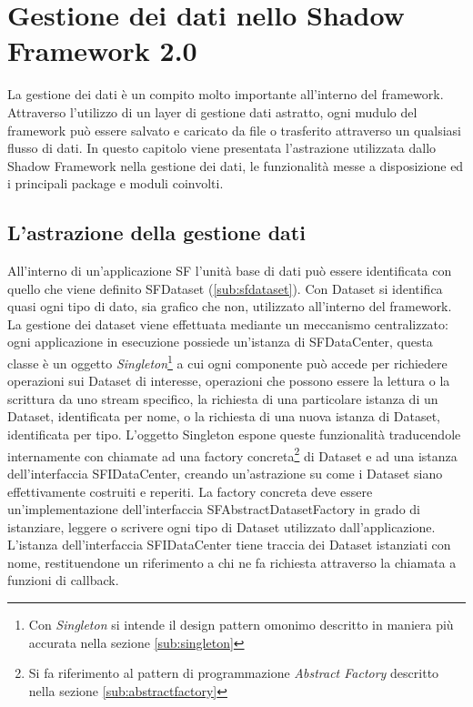 
\chapter{Gestione dei dati nello Shadow Framework 2.0}
\label{ch:gestionedati}

La gestione dei dati è un compito molto importante all'interno del framework. Attraverso l'utilizzo di un layer di gestione dati astratto, ogni mudulo del framework può essere salvato e caricato da file o trasferito attraverso un qualsiasi flusso di dati.
In questo capitolo viene presentata l'astrazione utilizzata dallo Shadow Framework nella gestione dei dati, le funzionalità messe a disposizione ed i principali package e moduli coinvolti.

\section{L'astrazione della gestione dati}
\label{sec:astrazione}
All'interno di un'applicazione \ac{SF} l'unità base di dati può essere identificata con quello che viene definito SFDataset (\ref{sub:sfdataset}). Con Dataset si identifica quasi ogni tipo di dato, sia grafico che non, utilizzato all'interno del framework.
La gestione dei dataset viene effettuata mediante un meccanismo centralizzato: ogni applicazione in esecuzione possiede un'istanza di SFDataCenter, questa classe è un oggetto \textit{Singleton}\footnote{Con \textit{Singleton} si intende il design pattern omonimo descritto in maniera più accurata nella sezione \ref{sub:singleton}}
a cui ogni componente può accede per richiedere operazioni sui Dataset di interesse, operazioni che possono essere la lettura o la scrittura da uno stream specifico, la richiesta di una particolare istanza di un Dataset, identificata per nome, o la richiesta di una nuova istanza di Dataset, identificata per tipo.
L'oggetto Singleton espone queste funzionalità traducendole internamente con chiamate ad una factory concreta\footnote{Si fa riferimento al pattern di programmazione \textit{Abstract Factory} descritto nella sezione \ref{sub:abstractfactory}}
di Dataset e ad una istanza dell'interfaccia SFIDataCenter, creando un'astrazione su come i Dataset siano effettivamente costruiti e reperiti.
La factory concreta deve essere un'implementazione dell'interfaccia SFAbstractDatasetFactory in grado di istanziare, leggere o scrivere ogni tipo di Dataset utilizzato dall'applicazione.
L'istanza dell'interfaccia SFIDataCenter tiene traccia dei Dataset istanziati con nome, restituendone un riferimento a chi ne fa richiesta attraverso la chiamata a funzioni di callback.

